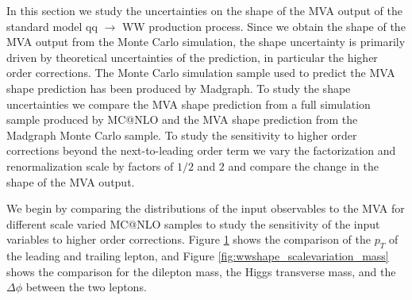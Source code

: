 In this section we study the uncertainties on the shape of the MVA output of the 
standard model qq $\rightarrow$ WW production process. Since we obtain the shape 
of the MVA output from the Monte Carlo simulation, the shape uncertainty is 
primarily driven by theoretical uncertainties of the prediction, in particular
the higher order corrections. The Monte Carlo simulation sample used to predict
the MVA shape prediction has been produced by Madgraph. To study the shape uncertainties
we compare the MVA shape prediction from a full simulation sample produced by MC@NLO
and the MVA shape prediction from the Madgraph Monte Carlo sample. To study the 
sensitivity to higher order corrections beyond the next-to-leading order term
we vary the factorization and renormalization scale by factors of $1/2$ and $2$ and
compare the change in the shape of the MVA output.

We begin by comparing the distributions of the input observables to the MVA for 
different scale varied MC@NLO samples to study the sensitivity of the input
variables to higher order corrections. Figure \ref{fig:wwshape_scalevariation_leptonPt}
shows the comparison of the $p_{T}$ of the leading and trailing lepton, and 
Figure \ref{fig:wwshape_scalevariation_mass} shows the comparison for
the dilepton mass, the Higgs transverse mass, and the $\Delta\phi$ between
the two leptons. 

\begin{figure}[!htbp]
\begin{center}
\caption{
}
\label{fig:wwshape_scalevariation_leptonPt}
\end{center}
\end{figure}

